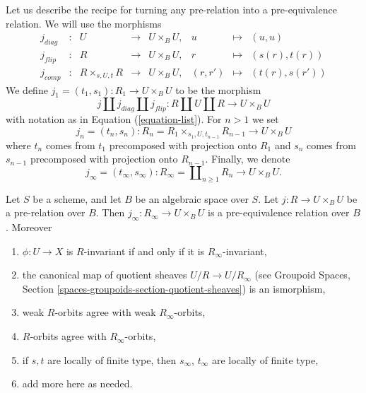 \noindent
Let us describe the recipe for turning any pre-relation into a
pre-equivalence relation. We will use the morphisms
\begin{equation}
\label{equation-list}
\begin{matrix}
j_{diag} &
: &
U &
\longrightarrow &
U \times_B U, &
u &
\longmapsto &
(u, u) \\
j_{flip} &
: &
R &
\longrightarrow &
U \times_B U, &
r &
\longmapsto &
(s(r), t(r)) \\
j_{comp} &
: &
R \times_{s, U, t} R &
\longrightarrow &
U \times_B U, &
(r, r') &
\longmapsto &
(t(r), s(r'))
\end{matrix}
\end{equation}
We define $j_1 = (t_1, s_1) : R_1 \to U \times_B U$ to be the morphism
$$
j \amalg j_{diag} \amalg j_{flip} :
R \amalg U \amalg R
\longrightarrow
U \times_B U
$$
with notation as in
Equation (\ref{equation-list}).
For $n > 1$ we set
$$
j_n = (t_n, s_n) :
R_n = R_1 \times_{s_1, U, t_{n - 1}} R_{n - 1} \longrightarrow U \times_B U
$$
where $t_n$ comes from $t_1$ precomposed with projection onto $R_1$ and
$s_n$ comes from $s_{n - 1}$ precomposed with projection onto $R_{n - 1}$.
Finally, we denote
$$
j_\infty = (t_\infty, s_\infty) :
R_\infty = \coprod\nolimits_{n \geq 1} R_n 
\longrightarrow
U \times_B U.
$$

\begin{lemma}
\label{lemma-make-pre-equivalence}
Let $S$ be a scheme, and let $B$ be an algebraic space over $S$.
Let $j : R \to U \times_B U$ be a pre-relation over $B$.
Then $j_\infty : R_\infty \to U \times_B U$ is a
pre-equivalence relation over $B$. Moreover
\begin{enumerate}
\item $\phi : U \to X$ is $R$-invariant if and only if it is
$R_\infty$-invariant,
\item the canonical map of quotient sheaves $U/R \to U/R_\infty$ (see
Groupoid Spaces, Section \ref{spaces-groupoids-section-quotient-sheaves})
is an ismorphism,
\item weak $R$-orbits agree with weak $R_\infty$-orbits,
\item $R$-orbits agree with $R_\infty$-orbits,
\item if $s, t$ are locally of finite type, then $s_\infty$, $t_\infty$
are locally of finite type,
\item add more here as needed.
\end{enumerate}
\end{lemma}

